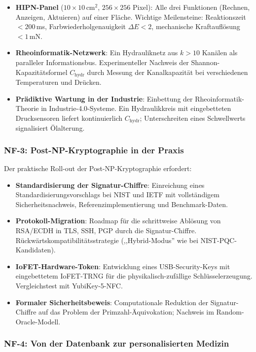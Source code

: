 ﻿\documentclass[a4paper,12pt]{scrreprt}
\theoremstyle{definition}
\begin{document}
\begin{itemize}
  \item \textbf{HIPN-Panel} ($10 \times 10$\,cm$^2$, $256 \times 256$
    Pixel): Alle drei Funktionen (Rechnen, Anzeigen, Aktuieren) auf
    einer Fläche. Wichtige Meilensteine: Reaktionszeit $< 200$\,ms,
    Farbwiederholgenauigkeit $\Delta E < 2$, mechanische Kraftauflösung
    $< 1$\,mN.
  \item \textbf{Rheoinformatik-Netzwerk}: Ein Hydrauliknetz aus
    $k > 10$ Kanälen als paralleler Informationsbus. Experimenteller
    Nachweis der Shannon-Kapazitätsformel $C_\mathrm{hydr}$ durch
    Messung der Kanalkapazität bei verschiedenen Temperaturen und
    Drücken.
  \item \textbf{Prädiktive Wartung in der Industrie}: Einbettung der
    Rheoinformatik-Theorie in Industrie-4.0-Systeme. Ein Hydraulikkreis
    mit eingebetteten Drucksensoren liefert kontinuierlich $C_\mathrm{hydr}$;
    Unterschreiten eines Schwellwerts signalisiert Ölalterung.
\end{itemize}

\subsubsection{NF-3: Post-NP-Kryptographie in der Praxis}

Der praktische Roll-out der Post-NP-Kryptographie erfordert:
\begin{itemize}
  \item \textbf{Standardisierung der Signatur-Chiffre}: Einreichung
    eines Standardisierungsvorschlags bei NIST und IETF mit vollständigem
    Sicherheitsnachweis, Referenzimplementierung und Benchmark-Daten.
  \item \textbf{Protokoll-Migration}: Roadmap für die schrittweise
    Ablösung von RSA/ECDH in TLS, SSH, PGP durch die Signatur-Chiffre.
    Rückwärtskompatibilitätsstrategie (,,Hybrid-Modus'' wie bei
    NIST-PQC-Kandidaten).
  \item \textbf{IoFET-Hardware-Token}: Entwicklung eines USB-Security-Keys
    mit eingebettetem IoFET-TRNG für die physikalisch-zufällige
    Schlüsselerzeugung. Vergleichstest mit YubiKey-5-NFC.
  \item \textbf{Formaler Sicherheitsbeweis}: Computationale Reduktion der
    Signatur-Chiffre auf das Problem der Primzahl-Äquivokation; Nachweis
    im Random-Oracle-Modell.
\end{itemize}

\subsubsection{NF-4: Von der Datenbank zur personalisierten Medizin}
\end{document}
